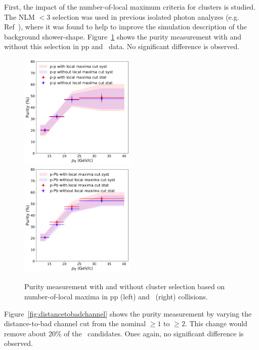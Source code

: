 First, the impact of the number-of-local maximum criteria for clusters is studied. The NLM $<3$ selection was used in previous isolated photon analyzes (e.g. Ref~\cite{Acharya:2019jkx,Erwann}), where it was found to help to improve the simulation description of the background shower-shape. Figure~\ref{fig:numberoflocalmaxima} shows the purity measurement with and without this selection in pp and \pPb~data. No significant difference is observed.

\begin{figure}
	\center
	\includegraphics[width=0.495\textwidth]{G-H_New/dPhi_to_0/NLMvariation_pp.png}
	\includegraphics[width=0.495\textwidth]{Checks_Systematics/NLMvariation_pPb}
	\caption{Purity measurement with and without cluster selection based on number-of-local maxima in pp (left) and \pPb~(right) collisions.}
	\label{fig:numberoflocalmaxima}
\end{figure}

Figure~\ref{fig:distancetobadchannel} shows the purity measurement by varying the distance-to-bad channel cut from the nominal $\geq 1$ to $\geq 2$. This change would remove about 20$\%$ of the \gammaiso~candidates. Onec again, no significant difference is observed. 

